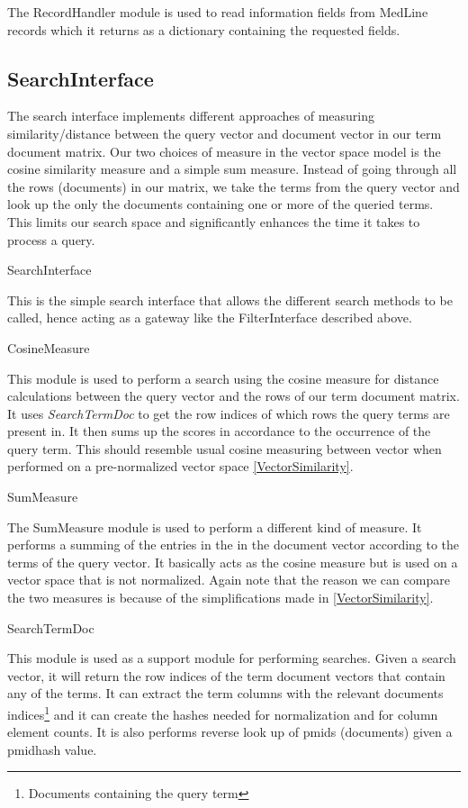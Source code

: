 The RecordHandler module is used to read information fields from
MedLine records which it returns as a dictionary containing the
requested fields.

\subsection{SearchInterface}

The search interface implements different approaches of measuring
similarity/distance between the query vector and document vector in
our term document matrix. Our two choices of measure in the vector
space model is the cosine similarity measure and a simple sum
measure. Instead of going through all the rows (documents) in our
matrix, we take the terms from the query vector and look up the only
the documents containing one or more of the queried terms. This limits
our search space and significantly enhances the time it takes to
process a query.

SearchInterface

This is the simple search interface that allows the different search
methods to be called, hence acting as a gateway like the
FilterInterface described above.

CosineMeasure

This module is used to perform a search using the cosine measure for
distance calculations between the query vector and the rows of our
term document matrix. It uses \textit{SearchTermDoc} to get the row
indices of which rows the query terms are present in. It then sums up
the scores in accordance to the occurrence of the query term. This
should resemble usual cosine measuring between vector when performed
on a pre-normalized vector space \ref{VectorSimilarity}.

SumMeasure

The SumMeasure module is used to perform a different kind of
measure. It performs a summing of the entries in the in the document
vector according to the terms of the query vector. It basically acts
as the cosine measure but is used on a vector space that is not
normalized. Again note that the reason we can compare the two measures
is because of the simplifications made in \ref{VectorSimilarity}.

SearchTermDoc

This module is used as a support module for performing searches. Given
a search vector, it will return the row indices of the term document
vectors that contain any of the terms. It can extract the term columns
with the relevant documents indices\footnote{Documents containing the
  query term} and it can create the hashes needed for normalization
and for column element counts. It is also performs reverse look up of
pmids (documents) given a pmidhash value.

